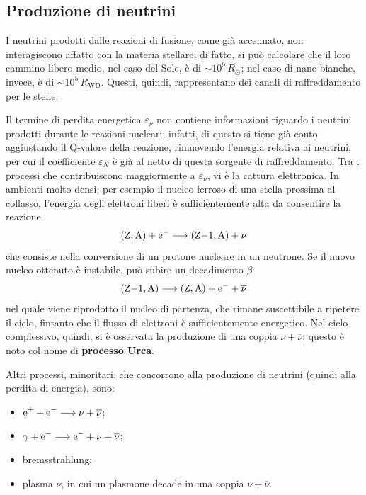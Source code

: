 \documentclass[11pt, a4paper]{scrartcl}
\theoremstyle{style}
\theoremstyle{style1}
\numberwithin{equation}{subsection}
\begin{document}
\subsection{Produzione di neutrini}
I neutrini prodotti dalle reazioni di fusione, come gi\`a accennato, non interagiscono affatto con la materia stellare; di fatto, si pu\`o calcolare che il loro cammino libero medio, nel caso del Sole, \`e di $\sim 10^9\, R_\odot $; nel caso di nane bianche, invece, \`e di $\sim 10^5 \, R_\text{WD}$.
Questi, quindi, rappresentano dei canali di raffreddamento per le stelle.

Il termine di perdita energetica $\varepsilon _\nu $ non contiene informazioni riguardo i neutrini prodotti durante le reazioni nucleari; infatti, di questo si tiene gi\`a conto aggiustando il Q-valore della reazione, rimuovendo l'energia relativa ai neutrini, per cui il coefficiente $\varepsilon _N$ \`e gi\`a al netto di questa sorgente di raffreddamento.
Tra i processi che contribuiscono maggiormente a $\varepsilon _\nu $, vi \`e la cattura elettronica.
In ambienti molto densi, per esempio il nucleo ferroso di una stella prossima al collasso, l'energia degli elettroni liberi \`e sufficientemente alta da consentire la reazione 
\[
	\ce{(Z,A) + e-} \longrightarrow \ce{(Z-1,A) + \nu }
\] 
che consiste nella conversione di un protone nucleare in un neutrone.
Se il nuovo nucleo ottenuto \`e instabile, pu\`o subire un decadimento $\beta $
\[
	\ce{(Z-1,A)} \longrightarrow \ce{(Z,A) + e- + \overline{\nu }}
\] 
nel quale viene riprodotto il nucleo di partenza, che rimane suscettibile a ripetere il ciclo, fintanto che il flusso di elettroni \`e sufficientemente energetico.
Nel ciclo complessivo, quindi, si \`e osservata la produzione di una coppia $\nu +\overline{\nu }$; questo \`e noto col nome di \textbf{processo Urca}.

Altri processi, minoritari, che concorrono alla produzione di neutrini (quindi alla perdita di energia), sono:
\begin{itemize}
	\item $\ce{e+ + e-} \longrightarrow \ce{{\nu} + \overline{\nu }}$;
	\item $\ce{{\gamma} + e-} \longrightarrow \ce{e- + {\nu} + \overline{\nu }}$;
	\item bremsstrahlung;
	\item plasma $\nu $, in cui un plasmone decade in una coppia $\nu  + \overline{\nu }$.
\end{itemize}

\newpage
\end{document}
